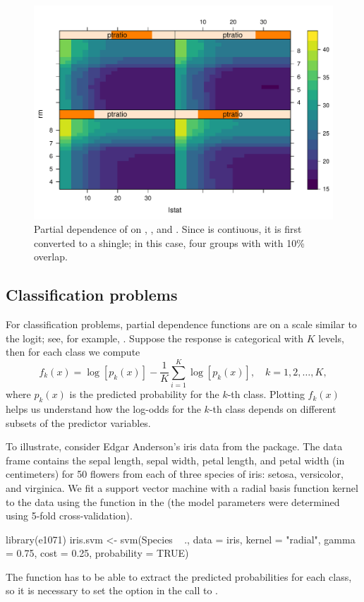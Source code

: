 \begin{figure}[htbp]
  \centering
  \includegraphics[width=0.8\linewidth]{partial_par}
  \caption{Partial dependence of  on , , and . Since  is contiuous, it is first converted to a shingle; in this case, four groups with with 10\% overlap.}
  \label{fig:partial_par}
\end{figure}

\subsection{Classification problems}

For classification problems, partial dependence functions are on a scale similar to the logit; see, for example, \citet[pp. 369--370]{hastie-elements-2009}. Suppose the response is categorical with $K$ levels, then for each class we compute
\begin{equation}
\label{eqn:avg-logit}
f_k(x) = \log\left[p_k(x)\right] - \frac{1}{K}\sum_{i = 1}^K\log\left[p_k(x)\right], \quad k = 1, 2, \dots, K,
\end{equation}
where $p_k(x)$ is the predicted probability for the $k$-th class. Plotting $f_k(x)$ helps us understand how the log-odds for the $k$-th class depends on different subsets of the predictor variables.

To illustrate, consider Edgar Anderson's iris data from the  package. The  data frame contains the sepal length, sepal width, petal length, and petal width (in centimeters) for 50 flowers from each of three species of iris:  setosa, versicolor, and virginica. We fit a support vector machine with a radial basis function kernel to the data using the  function in the  (the model parameters were determined using 5-fold cross-validation).
\begin{example}
library(e1071)
iris.svm <- svm(Species ~ ., data = iris, kernel = "radial", gamma = 0.75,
                cost = 0.25, probability = TRUE)
\end{example}
The  function has to be able to extract the predicted probabilities for each class, so it is necessary to set the  option in the call to .


